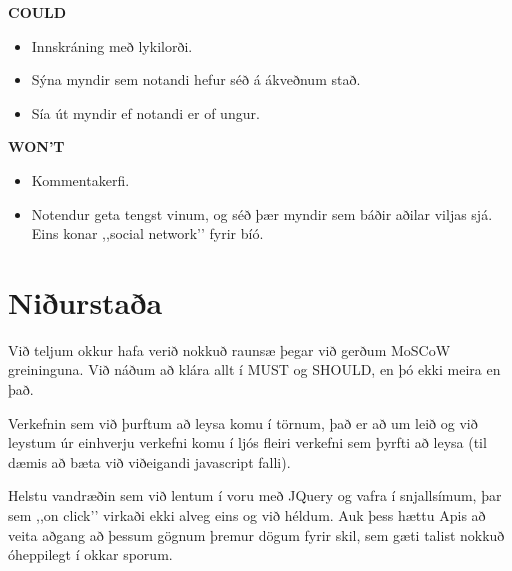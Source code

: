 \documentclass[a4paper,oneside]{article}
\begin{document}
\noindent\textbf{COULD}
\begin{itemize}
    \item Innskráning með lykilorði.
    \item Sýna myndir sem notandi hefur séð á ákveðnum stað.
    \item Sía út myndir ef notandi er of ungur.
\end{itemize}

\noindent\textbf{WON'T}
\begin{itemize}
    \item Kommentakerfi.
    \item Notendur geta tengst vinum, og séð þær myndir sem báðir aðilar viljas sjá. Eins konar ,,social network’’ fyrir bíó.
\end{itemize}

\section{Niðurstaða}
Við teljum okkur hafa verið nokkuð raunsæ þegar við gerðum MoSCoW greininguna.  Við náðum að klára allt í MUST og SHOULD, en þó ekki meira en það. 

Verkefnin sem við þurftum að leysa komu í törnum, það er að um leið og við leystum úr einhverju verkefni komu í ljós fleiri verkefni sem þyrfti að leysa (til dæmis að bæta við viðeigandi javascript falli).

Helstu vandræðin sem við lentum í voru með JQuery og vafra í snjallsímum, þar sem ,,on click’’ virkaði ekki alveg eins og við héldum. Auk þess hættu Apis að veita aðgang að þessum gögnum þremur dögum fyrir skil, sem gæti talist nokkuð óheppilegt í okkar sporum. 
\end{document}
